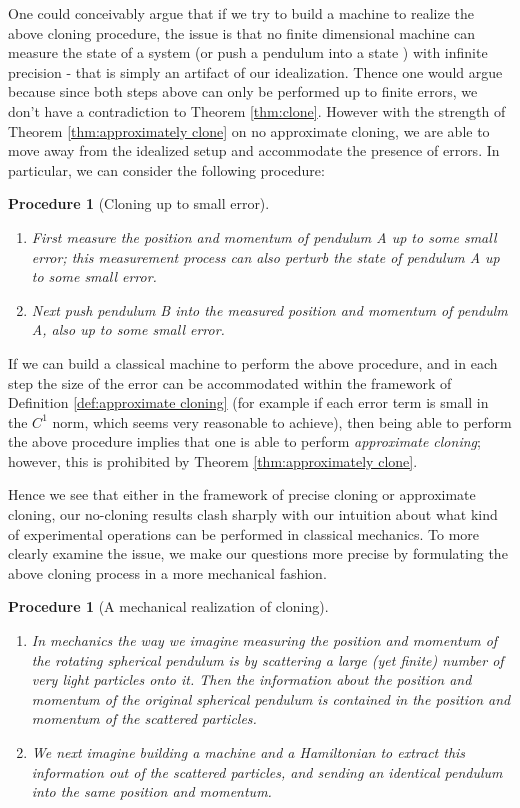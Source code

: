 \documentclass[jmp,amsmath,amssymb]{revtex4-1}
\theoremstyle{plain}
\newtheorem{procedure}[theorem]{Procedure}
\begin{document}
One could conceivably argue that if we try to build a machine to realize the above cloning procedure, the issue is that no finite dimensional machine can measure the state of a system (or push a pendulum into a state ) with infinite precision - that is simply an artifact of our idealization. Thence one would argue because since both steps above can only be performed up to finite errors, we don't have a contradiction to Theorem \ref{thm:clone}. However with the strength of Theorem \ref{thm:approximately clone} on no approximate cloning, we are able to move away from the idealized setup and accommodate the presence of errors. In particular, we can consider the following procedure:
\begin{procedure}[Cloning up to small error]
\begin{enumerate}
    \item \textup{First measure the position and momentum of pendulum A up to some small error; this measurement process can also perturb the state of pendulum A up to some small error.}
    \item \textup{ Next push pendulum B into the measured position and momentum of pendulm A, also up to some small error.}
\end{enumerate}
\end{procedure}
If we can build a classical machine to perform the above procedure, and in each step the size of the error can be accommodated within the framework of Definition \ref{def:approximate cloning} (for example if each error term is small in the $C^1$ norm, which seems very reasonable to achieve), then being able to perform the above procedure implies that one is able to perform \emph{approximate cloning}; however, this is prohibited by Theorem \ref{thm:approximately clone}.


Hence we see that either in the framework of precise cloning or approximate cloning, our no-cloning results clash sharply with our intuition about what kind of experimental operations can be performed in classical mechanics. To more clearly examine the issue, we make 
our questions more precise by formulating the above cloning process in a more mechanical fashion.
\begin{procedure}[A mechanical realization of cloning]
\begin{enumerate}
    \item \textup{In mechanics the way we imagine measuring the position and momentum of the rotating spherical pendulum is by scattering a large (yet finite) number of very light particles onto it. Then the information about the position and momentum of the original spherical pendulum is contained in the position and momentum of the scattered particles.}
    \item  \textup{We next imagine building a machine and a Hamiltonian to extract this information out of the scattered particles, and sending an identical pendulum into the same position and momentum. }
\end{enumerate}
\end{procedure}
\end{document}
